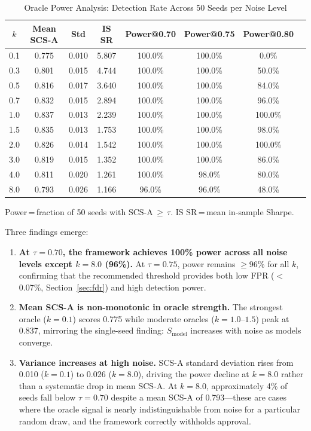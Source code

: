 \documentclass[12pt,a4paper]{article}
\begin{document}
\begin{table}[H]
\centering
\caption{Oracle Power Analysis: Detection Rate Across 50 Seeds per Noise Level}
\label{tab:power}
\small
\begin{tabular}{cccccccc}
\toprule
$k$ & Mean SCS-A & Std & IS SR & Power@0.70 & Power@0.75 & Power@0.80 \\
\midrule
0.1 & 0.775 & 0.010 & 5.807 & 100.0\% & 100.0\% &   0.0\% \\
0.3 & 0.801 & 0.015 & 4.744 & 100.0\% & 100.0\% &  50.0\% \\
0.5 & 0.816 & 0.017 & 3.640 & 100.0\% & 100.0\% &  84.0\% \\
0.7 & 0.832 & 0.015 & 2.894 & 100.0\% & 100.0\% &  96.0\% \\
1.0 & 0.837 & 0.013 & 2.239 & 100.0\% & 100.0\% & 100.0\% \\
1.5 & 0.835 & 0.013 & 1.753 & 100.0\% & 100.0\% &  98.0\% \\
2.0 & 0.826 & 0.014 & 1.542 & 100.0\% & 100.0\% & 100.0\% \\
3.0 & 0.819 & 0.015 & 1.352 & 100.0\% & 100.0\% &  86.0\% \\
4.0 & 0.811 & 0.020 & 1.261 & 100.0\% &  98.0\% &  80.0\% \\
8.0 & 0.793 & 0.026 & 1.166 &  96.0\% &  96.0\% &  48.0\% \\
\bottomrule
\end{tabular}
\smallskip

\footnotesize{Power\,=\,fraction of 50 seeds with SCS-A\,$\geq\,\tau$. IS SR\,=\,mean in-sample Sharpe.}
\end{table}

Three findings emerge:

\begin{enumerate}
  \item \textbf{At $\tau=0.70$, the framework achieves 100\% power across all noise levels except $k=8.0$ (96\%).} At $\tau=0.75$, power remains $\geq$96\% for all $k$, confirming that the recommended threshold provides both low FPR ($<$0.07\%, Section~\ref{sec:fdr}) and high detection power.

  \item \textbf{Mean SCS-A is non-monotonic in oracle strength.} The strongest oracle ($k=0.1$) scores 0.775 while moderate oracles ($k=1.0$--$1.5$) peak at 0.837, mirroring the single-seed finding: $S_{\text{model}}$ increases with noise as models converge.

  \item \textbf{Variance increases at high noise.} SCS-A standard deviation rises from 0.010 ($k=0.1$) to 0.026 ($k=8.0$), driving the power decline at $k=8.0$ rather than a systematic drop in mean SCS-A. At $k=8.0$, approximately 4\% of seeds fall below $\tau=0.70$ despite a mean SCS-A of 0.793---these are cases where the oracle signal is nearly indistinguishable from noise for a particular random draw, and the framework correctly withholds approval.
\end{enumerate}
\end{document}
